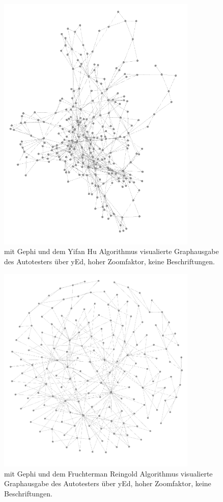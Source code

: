 \begin{figure}
	\centering
	\includegraphics[width=0.85\textwidth]{bilder/model_yed_notext_yh.png}
	\caption{mit Gephi und dem Yifan Hu Algorithmus\cite{hu2005efficient}
    visualierte Graphausgabe des Autotesters über yEd, hoher Zoomfaktor, keine Beschriftungen.}
	\label{fig:screenshot_yed_yh}
\end{figure}

\begin{figure}
	\centering
	\includegraphics[width=0.85\textwidth]{bilder/model_yed_notext_rf.png}
	\caption{mit Gephi und dem Fruchterman Reingold Algorithmus\cite{SPE:SPE4380211102}
    visualierte Graphausgabe des Autotesters über yEd, hoher Zoomfaktor, keine Beschriftungen.}
	\label{fig:screenshot_yed_rf}
\end{figure}

